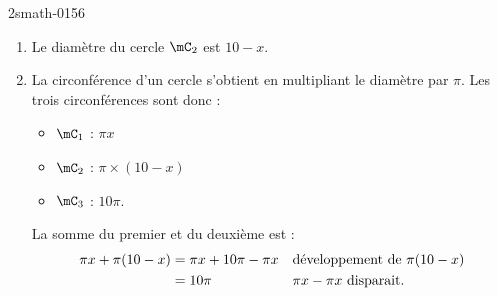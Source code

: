 
\begin{corrige}{2smath-0156}

    \begin{enumerate}
        \item
            Le diamètre du cercle \( \mC_2\) est \( 10-x\).
        \item
            La circonférence d'un cercle s'obtient en multipliant le diamètre par \( \pi\). Les trois circonférences sont donc :
            \begin{itemize}
                \item \( \mC_1\) : \( \pi x\)
                \item \( \mC_2\) : \( \pi\times(10-x)\)
                \item \( \mC_3\) : \( 10\pi\).
            \end{itemize}
            La somme du premier et du deuxième est :
            \begin{subequations}
                \begin{align}
                    \pi x+\pi(10-x)&=\pi x+10 \pi-\pi x&&\text{développement de \( \pi(10-x)\)}\\
                    &=10\pi&&\text{\( \pi x-\pi x\) disparait.}
                \end{align}
            \end{subequations}
    \end{enumerate}

\end{corrige}
